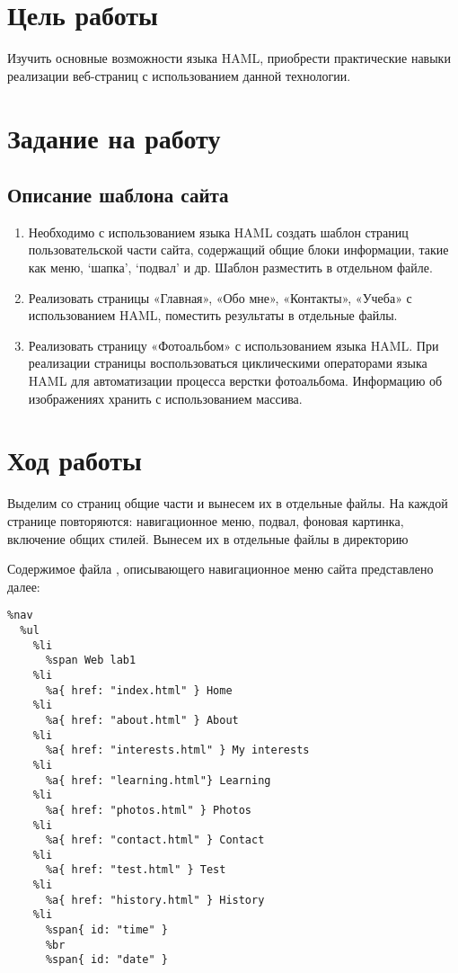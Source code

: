 \documentclass[a4paper,14pt]{extarticle}
\begin{document}


\section{Цель работы}
Изучить основные возможности языка HAML, приобрести практические
навыки реализации веб-страниц с использованием данной технологии.

\section{Задание на работу}

\subsection{Описание шаблона сайта}
\begin{enumerate}
    \item Необходимо с использованием языка HAML создать шаблон страниц
    пользовательской части сайта, содержащий общие блоки информации, такие
    как меню, ‘шапка’, ‘подвал’ и др. Шаблон разместить в отдельном файле.
    \item Реализовать страницы «Главная», «Обо мне», «Контакты», «Учеба»
    с использованием HAML, поместить результаты в отдельные файлы.
    \item Реализовать страницу «Фотоальбом» с использованием языка
    HAML. При реализации страницы воспользоваться циклическими
    операторами языка HAML для автоматизации процесса верстки фотоальбома.
    Информацию об изображениях хранить с использованием массива.
\end{enumerate}

\section{Ход работы}
Выделим со страниц общие части и вынесем их в отдельные файлы. На каждой
странице повторяются: навигационное меню, подвал, фоновая картинка,
включение общих стилей. Вынесем их в отдельные файлы в директорию 

Содержимое файла , описывающего навигационное меню сайта представлено далее:
\begin{lstlisting}
%nav
  %ul
    %li
      %span Web lab1
    %li
      %a{ href: "index.html" } Home
    %li
      %a{ href: "about.html" } About
    %li
      %a{ href: "interests.html" } My interests
    %li
      %a{ href: "learning.html"} Learning
    %li
      %a{ href: "photos.html" } Photos
    %li
      %a{ href: "contact.html" } Contact
    %li
      %a{ href: "test.html" } Test
    %li
      %a{ href: "history.html" } History
    %li
      %span{ id: "time" }
      %br
      %span{ id: "date" }
\end{lstlisting}
\end{document}
